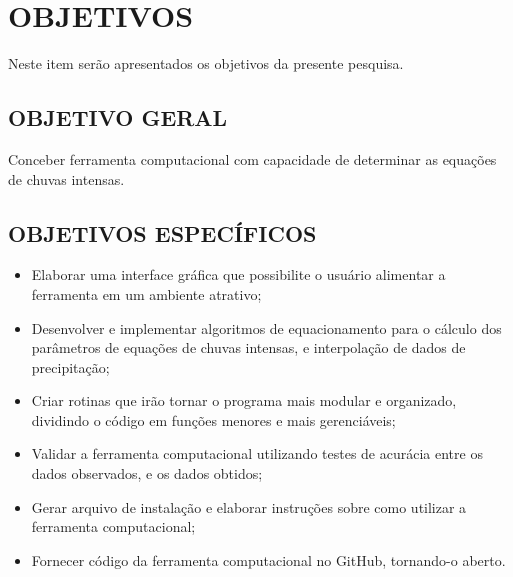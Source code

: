\chapter{OBJETIVOS}

Neste item serão apresentados os objetivos da presente pesquisa.

\section{OBJETIVO GERAL}

Conceber ferramenta computacional com capacidade de determinar as equações de chuvas intensas. 

\section{OBJETIVOS ESPECÍFICOS}

\begin{itemize}
        \item Elaborar uma interface gráfica que possibilite o usuário alimentar a ferramenta em um ambiente atrativo;
        \item Desenvolver e implementar algoritmos de equacionamento para o cálculo dos parâmetros de equações de chuvas intensas, e interpolação de dados de precipitação;
        \item Criar rotinas que irão tornar o programa mais modular e organizado, dividindo o código em funções menores e mais gerenciáveis;
        \item Validar a ferramenta computacional utilizando testes de acurácia entre os dados observados, e os dados obtidos;
        \item Gerar arquivo de instalação e elaborar instruções sobre como utilizar a ferramenta computacional;

        \item Fornecer código da ferramenta computacional no GitHub, tornando-o aberto.
\end{itemize}

